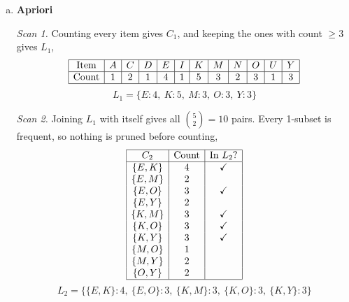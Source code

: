 \documentclass[12pt,letterpaper, onecolumn]{exam}
\begin{document}
\begin{questions}
\begin{solution}
        \begin{enumerate}[a.)]
            \item \textbf{Apriori}

            \textit{Scan 1.} Counting every item gives $C_1$, and keeping the ones with count $\geq 3$ gives $L_1$,
            \begin{equation*}
                \begin{array}{|c|c|c|c|c|c|c|c|c|c|c|c|}
                    \hline \text{Item} & A & C & D & E & I & K & M & N & O & U & Y \\ \hline
                    \text{Count} & 1 & 2 & 1 & 4 & 1 & 5 & 3 & 2 & 3 & 1 & 3 \\ \hline
                \end{array}
            \end{equation*}
            \begin{equation*}
                L_1 = \{E:4,\ K:5,\ M:3,\ O:3,\ Y:3\}
            \end{equation*}

            \textit{Scan 2.} Joining $L_1$ with itself gives all $\binom{5}{2}=10$ pairs. Every 1-subset is frequent, so nothing is pruned before counting,
            \begin{equation*}
                \begin{array}{|c|c|c|}
                    \hline C_2 & \text{Count} & \text{In } L_2? \\ \hline
                    \{E,K\} & 4 & \checkmark \\
                    \{E,M\} & 2 & \\
                    \{E,O\} & 3 & \checkmark \\
                    \{E,Y\} & 2 & \\
                    \{K,M\} & 3 & \checkmark \\
                    \{K,O\} & 3 & \checkmark \\
                    \{K,Y\} & 3 & \checkmark \\
                    \{M,O\} & 1 & \\
                    \{M,Y\} & 2 & \\
                    \{O,Y\} & 2 & \\ \hline
                \end{array}
            \end{equation*}
            \begin{equation*}
                L_2 = \{\{E,K\}:4,\ \{E,O\}:3,\ \{K,M\}:3,\ \{K,O\}:3,\ \{K,Y\}:3\}
            \end{equation*}


\end{enumerate}
\end{solution}
\end{questions}
\end{document}
